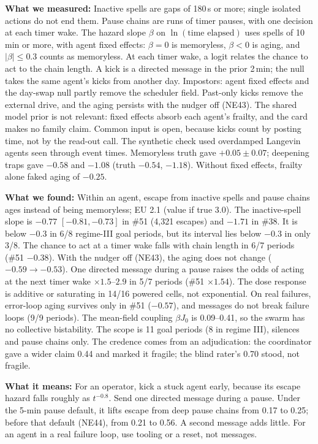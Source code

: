 \textbf{What we measured:} Inactive spells are gaps of 180\,s or more; single isolated actions do not end them. Pause chains are runs of timer pauses, with one decision at each timer wake. The hazard slope $\beta$ on $\ln(\text{time elapsed})$ uses spells of 10\,min or more, with agent fixed effects: $\beta=0$ is memoryless, $\beta<0$ is aging, and $|\beta|\le0.3$ counts as memoryless. At each timer wake, a logit relates the chance to act to the chain length. A kick is a directed message in the prior 2\,min; the null takes the same agent's kicks from another day. Impostors: agent fixed effects and the day-swap null partly remove the scheduler field. Past-only kicks remove the external drive, and the aging persists with the nudger off (NE43). The shared model prior is not relevant: fixed effects absorb each agent's frailty, and the card makes no family claim. Common input is open, because kicks count by posting time, not by the read-out call. The synthetic check used overdamped Langevin agents seen through event times. Memoryless truth gave $+0.05\pm0.07$; deepening traps gave $-0.58$ and $-1.08$ (truth $-0.54$, $-1.18$). Without fixed effects, frailty alone faked aging of $-0.25$.

\textbf{What we found:} Within an agent, escape from inactive spells and pause chains ages instead of being memoryless; EU 2.1 (value if true 3.0). The inactive-spell slope is $-0.77$ $[-0.81,-0.73]$ in \#51 (4,321 escapes) and $-1.71$ in \#38. It is below $-0.3$ in 6/8 regime-III goal periods, but its interval lies below $-0.3$ in only 3/8. The chance to act at a timer wake falls with chain length in 6/7 periods (\#51 $-0.38$). With the nudger off (NE43), the aging does not change ($-0.59\to-0.53$). One directed message during a pause raises the odds of acting at the next timer wake $\times1.5$--$2.9$ in 5/7 periods (\#51 $\times1.54$). The dose response is additive or saturating in 14/16 powered cells, not exponential. On real failures, error-loop aging survives only in \#51 ($-0.57$), and messages do not break failure loops (9/9 periods). The mean-field coupling $\beta J_0$ is 0.09--0.41, so the swarm has no collective bistability. The scope is 11 goal periods (8 in regime III), silences and pause chains only. The credence comes from an adjudication: the coordinator gave a wider claim 0.44 and marked it fragile; the blind rater's 0.70 stood, not fragile.

\textbf{What it means:} For an operator, kick a stuck agent early, because its escape hazard falls roughly as $t^{-0.8}$. Send one directed message during a pause. Under the 5-min pause default, it lifts escape from deep pause chains from 0.17 to 0.25; before that default (NE44), from 0.21 to 0.56. A second message adds little. For an agent in a real failure loop, use tooling or a reset, not messages.

